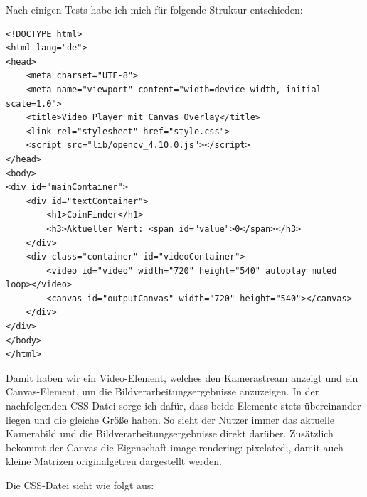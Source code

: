 Nach einigen Tests habe ich mich für folgende Struktur entschieden:
\begin{lstlisting}[style=HTML]
<!DOCTYPE html>
<html lang="de">
<head>
    <meta charset="UTF-8">
    <meta name="viewport" content="width=device-width, initial-scale=1.0">
    <title>Video Player mit Canvas Overlay</title>
    <link rel="stylesheet" href="style.css">
    <script src="lib/opencv_4.10.0.js"></script>
</head>
<body>
<div id="mainContainer">
    <div id="textContainer">
        <h1>CoinFinder</h1>
        <h3>Aktueller Wert: <span id="value">0</span></h3>
    </div>
    <div class="container" id="videoContainer">
        <video id="video" width="720" height="540" autoplay muted loop></video>
        <canvas id="outputCanvas" width="720" height="540"></canvas>
    </div>
</div>
</body>
</html>
\end{lstlisting}

Damit haben wir ein Video-Element, welches den Kamerastream anzeigt und ein Canvas-Element, um die Bildverarbeitungsergebnisse anzuzeigen. In der nachfolgenden CSS-Datei sorge ich dafür, dass beide Elemente stets übereinander liegen und die gleiche Größe haben. So sieht der Nutzer immer das aktuelle Kamerabild und die Bildverarbeitungsergebnisse direkt darüber. Zusätzlich bekommt der Canvas die Eigenschaft \glqq image-rendering: pixelated;\grqq{}, damit auch kleine Matrizen originalgetreu dargestellt werden.

Die CSS-Datei sieht wie folgt aus:


